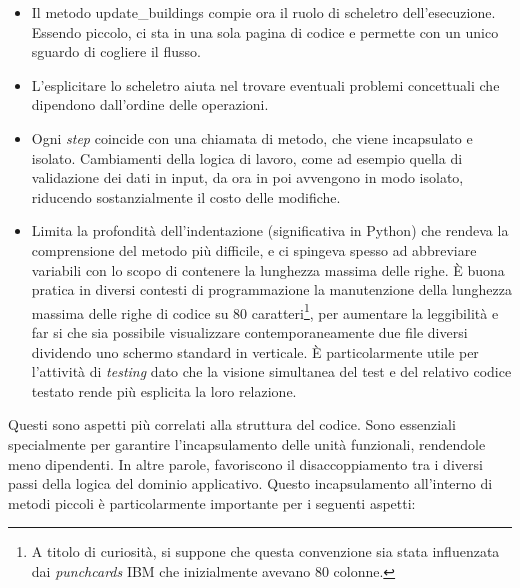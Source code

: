 \documentclass[12pt]{report}
\begin{document}
\begin{itemize}
  \item Il metodo update\_buildings compie ora il ruolo
  di scheletro dell'esecuzione. Essendo piccolo, ci sta in una sola
  pagina di codice e permette con un unico sguardo di cogliere il flusso.
  \item L'esplicitare lo scheletro aiuta nel trovare
   eventuali problemi concettuali che dipendono dall'ordine
   delle operazioni.
  \item Ogni \textit{step} coincide con una chiamata di metodo, 
  che viene incapsulato e isolato. Cambiamenti della logica di
  lavoro, come ad esempio quella di validazione dei dati in input,
  da ora in poi avvengono in modo isolato, riducendo
  sostanzialmente il costo delle modifiche.
  \item Limita la profondità dell'indentazione (significativa in Python) 
  che rendeva la comprensione del metodo più difficile, e ci spingeva spesso
  ad abbreviare variabili con lo scopo di contenere la lunghezza massima
  delle righe. 
  È buona pratica in diversi contesti di programmazione 
  la manutenzione della lunghezza massima delle righe di codice su 
  80 caratteri\footnote{
  A titolo di curiosità, si suppone che questa convenzione sia stata 
  influenzata dai \textit{punchcards} IBM che inizialmente avevano 80 colonne.
  }, 
  per aumentare la leggibilità e far si che sia possibile visualizzare
  contemporaneamente due file diversi dividendo uno schermo standard
  in verticale. È particolarmente utile per l'attività di \textit{testing} 
  dato che la visione simultanea del test e del relativo codice testato
  rende più esplicita la loro relazione.  
\end{itemize}

Questi sono aspetti più correlati alla struttura del codice. Sono essenziali
specialmente per garantire l'incapsulamento delle unità funzionali, rendendole
meno dipendenti. In altre parole, favoriscono il disaccoppiamento tra i diversi
passi della logica del dominio applicativo. Questo incapsulamento all'interno
di metodi piccoli è particolarmente importante per i seguenti aspetti:
\end{document}
